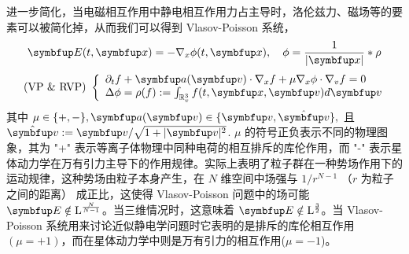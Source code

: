 进一步简化，当电磁相互作用中静电相互作用力占主导时，洛伦兹力、磁场等的要素可以被简化掉，从而我们可以得到 Vlasov-Poisson 系统，
\begin{equation}
    \vE(t, \vx)=-\nabla_{x} \phi(t, \vx), \quad \phi= \frac{1}{|\vx|} *\rho 
\end{equation}
\begin{equation}
    \label{eq:vp}
    \text { (VP \& RVP) }\left\{\begin{array}{l}
    \partial_{t} f+\vect{a}(\vv ) \cdot \nabla_{x} f+\mu \nabla_{x} \phi \cdot \nabla_{v} f=0 \\
    \Delta \phi=\rho(f):=\int_{\bbRv} \ftxv d \vv
\end{array}\right.\end{equation}
其中 $\mu \in\{+,-\}, \vect{a}(\vv) \in\{\vv, \hat{\vv}\},$ 且 $\hat{\vv}:=\vv / \sqrt{1+|\vv|^{2}}$. 
$\mu$ 的符号正负表示不同的物理图象，其为 "+" 表示等离子体物理中同种电荷的相互排斥的库伦作用，而 "-" 表示星体动力学在万有引力主导下的作用规律。\eqvp 实际上表明了粒子群在一种势场作用下的运动规律，这种势场由粒子本身产生，在 $N$ 维空间中场强与 $1/r^{N-1}$ （$r$ 为粒子之间的距离） 成正比，这使得 Vlasov-Poisson 问题中的场可能 $\vE \notin \mathrm{L}^{\frac{N}{N-1}}$。当三维情况时，这意味着 $\vE \notin \mathrm{L}^{\frac{3}{2}}$。当 Vlasov-Poisson 系统用来讨论近似静电学问题时它表明的是排斥的库伦相互作用 $(\mu=+1)$，而在星体动力学中则是万有引力的相互作用($\mu = -1$)。

